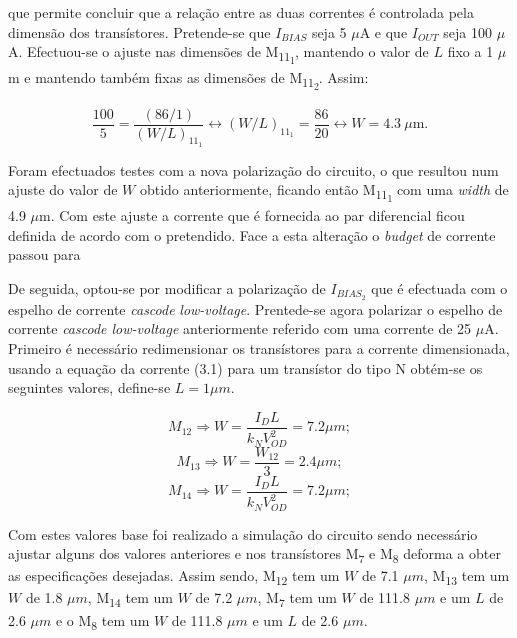 \documentclass[11pt]{article}
\numberwithin{equation}{section}
\begin{document}
\vspace{1mm}
que permite concluir que a relação entre as duas correntes é controlada pela dimensão dos transístores. Pretende-se que $I_{BIAS}$ seja 5 $\mu$A e que $I_{OUT}$ seja 100 $\mu$A. Efectuou-se o ajuste nas dimensões de M\textsubscript{11\textsubscript{1}}, mantendo o valor de $L$ fixo a 1 $\mu$m e mantendo também fixas as dimensões de M\textsubscript{11\textsubscript{2}}. Assim:

\vspace{-2mm}
\begin{equation}
\frac{100}{5} = \frac{\left(86/1\right)}{\left(W/L\right)_{11_{1}}} \leftrightarrow \left(W/L\right)_{11_{1}} = \frac{86}{20} \leftrightarrow W = 4.3~\mu\text{m}.
\end{equation}

\vspace{1mm}
Foram efectuados testes com a nova polarização do circuito, o que resultou num ajuste do valor de $W$ obtido anteriormente, ficando então M\textsubscript{11\textsubscript{1}} com uma \textit{width} de 4.9 $\mu$m. Com este ajuste a corrente que é fornecida ao par diferencial ficou definida de acordo com o pretendido. Face a esta alteração o \textit{budget} de corrente passou para 

De seguida, optou-se por modificar a polarização de $I_{BIAS_{2}}$ que é efectuada com o espelho de corrente \textit{cascode} \textit{low-voltage}. Prentede-se agora polarizar o espelho de corrente \textit{cascode low-voltage} anteriormente referido com uma corrente de 25 $\mu$A. Primeiro é necessário redimensionar os transístores para a corrente dimensionada, usando a equação da corrente (3.1) para um transístor do tipo N obtém-se os seguintes valores, define-se $L = 1\mu m$.

	\vspace{-2mm}
	\begin{equation}
	M_{12} \Rightarrow W = \frac{I_D L}{k_N V_{OD} ^2 } = 7.2 \mu m;
	\end{equation}
	\begin{equation}
	M_{13} \Rightarrow W =\frac{W_{12}}{3} = 2.4 \mu m;
	\end{equation}
	\begin{equation}
	M_{14} \Rightarrow W = \frac{I_D L}{k_N V_{OD} ^2 } = 7.2 \mu m;
	\end{equation}

Com estes valores base foi realizado a simulação do circuito sendo necessário ajustar alguns dos valores anteriores e nos transístores M\textsubscript{7} e M\textsubscript{8} deforma a obter as especificações desejadas. Assim sendo,
M\textsubscript{12} tem um $W$ de 7.1 $\mu m$, M\textsubscript{13} tem um $W$ de 1.8 $\mu m$, M\textsubscript{14} tem um $W$ de 7.2 $\mu m$, M\textsubscript{7} tem um $W$ de 111.8 $\mu m$ e um $L$ de 2.6 $\mu m$ e o M\textsubscript{8} tem um $W$ de 111.8 $\mu m$ e um $L$ de 2.6 $\mu m$.
\end{document}
